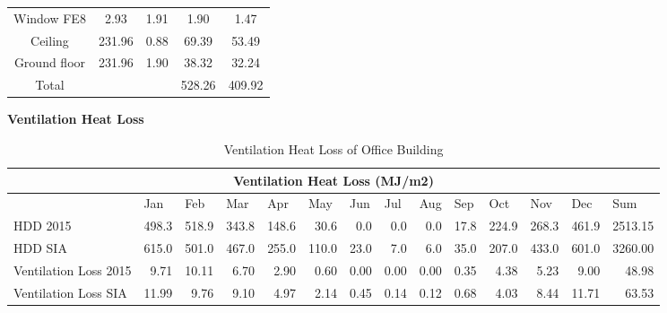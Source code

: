 \documentclass[a4paper, oneside]{discothesis}
\begin{document}
\begin{table}[H]
\begin{tabular}{crrrr}
		    Window FE8 & \multicolumn{1}{c}{2.93} & \multicolumn{1}{c}{1.91} & \multicolumn{1}{c}{1.90} & \multicolumn{1}{c}{1.47} \\
		    Ceiling & \multicolumn{1}{c}{231.96} & \multicolumn{1}{c}{0.88} & \multicolumn{1}{c}{69.39} & \multicolumn{1}{c}{53.49} \\
		    Ground floor & \multicolumn{1}{c}{231.96} & \multicolumn{1}{c}{1.90} & \multicolumn{1}{c}{38.32} & \multicolumn{1}{c}{32.24} \\
		    \midrule
		    Total &       &       & 528.26 & 409.92 \\
		    \bottomrule
		    \end{tabular}%
		  \label{tab:SumatraTransmission Loss}%
		\end{table}%


		\textbf{Ventilation Heat Loss}\\
\begin{table}[H]
  \centering
  \small
  \caption{Ventilation Heat Loss of Office Building}
    \begin{tabular}{|p{4.5em}rrrrrrrrrrrrr|}
    \toprule
    \multicolumn{14}{|c|}{Ventilation Heat Loss (MJ/m2)} \\
    \midrule
    \multicolumn{1}{|l}{ } & \multicolumn{1}{l}{Jan} & \multicolumn{1}{l}{Feb} & \multicolumn{1}{l}{Mar} & \multicolumn{1}{l}{Apr} & \multicolumn{1}{l}{May} & \multicolumn{1}{l}{Jun} & \multicolumn{1}{l}{Jul} & \multicolumn{1}{l}{Aug} & \multicolumn{1}{l}{Sep} & \multicolumn{1}{l}{Oct} & \multicolumn{1}{l}{Nov} & \multicolumn{1}{l}{Dec} & \multicolumn{1}{l|}{Sum} \\
    \midrule
    \multicolumn{1}{|l}{HDD 2015} & 498.3 & 518.9 & 343.8 & 148.6 & 30.6 & 0.0  & 0.0  & 0.0  & 17.8 & 224.9 & 268.3 & 461.9 & 2513.15 \\
    \multicolumn{1}{|l}{HDD SIA} & 615.0 & 501.0 & 467.0 & 255.0 & 110.0 & 23.0 & 7.0  & 6.0  & 35.0 & 207.0 & 433.0 & 601.0 & 3260.00 \\
    Ventilation Loss 2015 & 9.71 & 10.11 & 6.70 & 2.90 & 0.60 & 0.00 & 0.00 & 0.00 & 0.35 & 4.38 & 5.23 & 9.00 & 48.98 \\
    Ventilation Loss SIA & 11.99 & 9.76 & 9.10 & 4.97 & 2.14 & 0.45 & 0.14 & 0.12 & 0.68 & 4.03 & 8.44 & 11.71 & 63.53 \\
    \bottomrule
    \end{tabular}%
  \label{tab:SumatraVentLoss}%
\end{table}%
\end{document}
